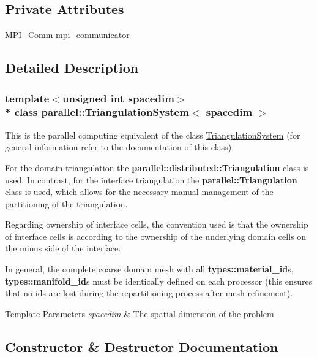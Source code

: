 \subsection*{Private Attributes}
\begin{DoxyCompactItemize}
\item 
M\+P\+I\+\_\+\+Comm \hyperlink{classparallel_1_1_triangulation_system_aff7cdcf04d5a4fb633d714130da893b0}{mpi\+\_\+communicator}
\end{DoxyCompactItemize}


\subsection{Detailed Description}
\subsubsection*{template$<$unsigned int spacedim$>$\\*
class parallel\+::\+Triangulation\+System$<$ spacedim $>$}

This is the parallel computing equivalent of the class \hyperlink{classparallel_1_1_triangulation_system}{Triangulation\+System} (for general information refer to the documentation of this class).

For the domain triangulation the {\bf parallel\+::distributed\+::\+Triangulation} class is used. In contrast, for the interface triangulation the {\bf parallel\+::\+Triangulation} class is used, which allows for the necessary manual management of the partitioning of the triangulation.

Regarding ownership of interface cells, the convention used is that the ownership of interface cells is according to the ownership of the underlying domain cells on the minus side of the interface.

In general, the complete coarse domain mesh with all {\bf types\+::material\+\_\+id}s, {\bf types\+::manifold\+\_\+id}s must be identically defined on each processor (this ensures that no ids are lost during the repartitioning process after mesh refinement).


\begin{DoxyTemplParams}{Template Parameters}
{\em spacedim} & The spatial dimension of the problem. \\
\hline
\end{DoxyTemplParams}


\subsection{Constructor \& Destructor Documentation}
